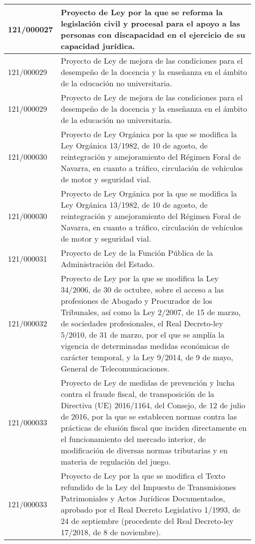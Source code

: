 {\begin{table}[H]
\begin{center}
\begin{tabularx}{\linewidth}{| l | X |}
\hline
121/000027 & Proyecto de Ley por la que se reforma la legislación civil y procesal para el apoyo a las personas con discapacidad en el ejercicio de su capacidad jurídica. \\
\hline
121/000029 & Proyecto de Ley de mejora de las condiciones para el desempeño de la docencia y la enseñanza en el ámbito de la educación no universitaria. \\
\hline
121/000029 & Proyecto de Ley de mejora de las condiciones para el desempeño de la docencia y la enseñanza en el ámbito de la educación no universitaria. \\
\hline
121/000030 & Proyecto de Ley Orgánica por la que se modifica la Ley Orgánica 13/1982, de 10 de agosto, de reintegración y amejoramiento del Régimen Foral de Navarra, en cuanto a tráfico, circulación de vehículos de motor y seguridad vial. \\
\hline
121/000030 & Proyecto de Ley Orgánica por la que se modifica la Ley Orgánica 13/1982, de 10 de agosto, de reintegración y amejoramiento del Régimen Foral de Navarra, en cuanto a tráfico, circulación de vehículos de motor y seguridad vial. \\
\hline
121/000031 & Proyecto de Ley de la Función Pública de la Administración del Estado. \\
\hline
121/000032 & Proyecto de Ley por la que se modifica la Ley 34/2006, de 30 de octubre, sobre el acceso a las profesiones de Abogado y Procurador de los Tribunales, así como la Ley 2/2007, de 15 de marzo, de sociedades profesionales, el Real Decreto-ley 5/2010, de 31 de marzo, por el que se amplía la vigencia de determinadas medidas económicas de carácter temporal, y la Ley 9/2014, de 9 de mayo, General de Telecomunicaciones. \\
\hline
121/000033 & Proyecto de Ley de medidas de prevención y lucha contra el fraude fiscal, de transposición de la Directiva (UE) 2016/1164, del Consejo, de 12 de julio de 2016, por la que se establecen normas contra las prácticas de elusión fiscal que inciden directamente en el funcionamiento del mercado interior, de modificación de diversas normas tributarias y en materia de regulación del juego. \\
\hline
121/000033 & Proyecto de Ley por la que se modifica el Texto refundido de la Ley del Impuesto de Transmisiones Patrimoniales y Actos Jurídicos Documentados, aprobado por el Real Decreto Legislativo 1/1993, de 24 de septiembre (procedente del Real Decreto-ley 17/2018, de 8 de noviembre). \\

\end{tabularx}
\end{center}
\end{table}}
